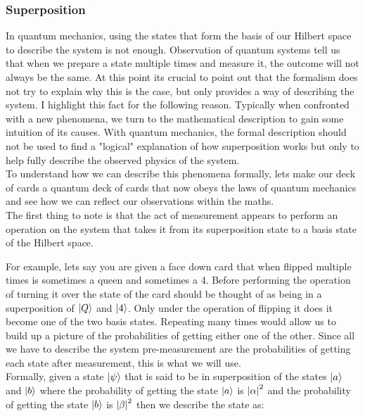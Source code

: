 \subsubsection{Superposition}

In quantum mechanics, using the states that form the basis of our Hilbert space to describe the system is not enough. Observation of quantum systems tell us that when we prepare a state multiple times and measure it, the outcome will not always be the same. At this point its crucial to point out that the formalism does not try to explain why this is the case, but only provides a way of describing the system. I highlight this fact for the following reason. Typically when confronted with a new phenomena, we turn to the mathematical description to gain some intuition of its causes. With quantum mechanics, the formal description should not be used to find a "logical" explanation of how superposition works but only to help fully describe the observed physics of the system.\\

To understand how we can describe this phenomena formally, lets make our deck of cards a quantum deck of cards that now obeys the laws of quantum mechanics and see how we can reflect our observations within the maths.\\

The first thing to note is that the act of measurement appears to perform an operation on the system that takes it from its superposition state to a basis state of the Hilbert space.

For example, lets say you are given a face down card that when flipped multiple times is sometimes a queen and sometimes a 4. Before performing the operation of turning it over the state of the card should be thought of as being in a superposition of $\left\vert{Q}\right\rangle$ and $\left\vert{4}\right\rangle$. Only under the operation of flipping it does it become one of the two basis states. Repeating many times would allow us to build up a picture of the probabilities of getting either one of the other. Since all we have to describe the system pre-measurement are the probabilities of getting each state after measurement, this is what we will use.\\

Formally, given a state $\left\vert{\psi}\right\rangle$ that is said to be in superposition of the states $\left\vert{a}\right\rangle$ and $\left\vert{b}\right\rangle$ where the probability of getting the state $\left\vert{a}\right\rangle$ is $\abs{\alpha}^{2}$ and the probability of getting the state $\left\vert{b}\right\rangle$ is $\abs{\beta}^{2}$ then we describe the state as:

